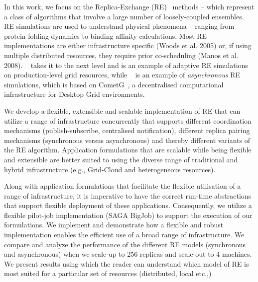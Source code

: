 \documentclass{rspublic}
\begin{document}
In this work, we focus on the Replica-Exchange
(RE)~\citep{hansmann,Sugita:1999rm} methods -- which represent a class
of algorithms that involve a large number of loosely-coupled
ensembles.  RE simulations are used to understand physical phenomena
-- ranging from protein folding dynamics to binding affinity
calculations. Most RE implementations are either infrastructure
specific (Woods et al. 2005) or, if using multiple distributed
resources, they require prior co-scheduling (Manos et
al. 2008). ~\citep{Luckow:2008fp} takes it to the next level and is an
example of adaptive RE simulations on production-level grid resources,
while ~\citep{parashar_arepex} is an example of \emph{asynchronous} RE
simulations, which is based on
CometG~\citep{Li:2005:CSC:1090948.1091381}, a decentralised
computational infrastructure for Desktop Grid environments.

We develop a flexible, extensible and scalable implementation of RE
that can utilize a range of infrastructure concurrently that supports
different coordination mechanisms (publish-subscribe, centralised
notification), different replica pairing mechanisms (synchronous
versus asynchronous) and thereby different variants of the RE
algorithm.  Application formulations that are scalable while being
flexible and extensible are better suited to using the diverse range
of traditional and hybrid infrastructure (e.g., Grid-Cloud and
heterogeneous resources).  

Along with application formulations that facilitate the flexible
utilisation of a range of infrastructure, it is imperative to have the
correct run-time abstractions that support flexible deployment of
these applications.  Consequently, we utilize a flexible pilot-job
implementation (SAGA BigJob) to support the execution of our
formulations.  We implement and demonstrate how a flexible and robust
implementation enables the efficient use of a broad range of
infrastructure. We compare and analyze the performance of the
different RE models (synchronous and asynchronous) when we scale-up to
256 replicas and scale-out to 4 machines. We present results using
which the reader can understand which model of RE is most suited for a
particular set of resources (distributed, local etc.,)
\end{document}
